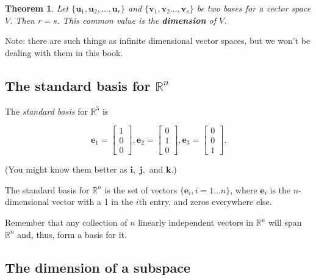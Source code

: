 \documentclass[
]{book}
\newtheorem{theorem}{Theorem}[chapter]
\theoremstyle{definition}
\theoremstyle{definition}
\theoremstyle{definition}
\theoremstyle{definition}
\theoremstyle{remark}
\begin{document}
\begin{theorembox}

\begin{theorem}
Let \(\{\mathbf{u}_1,\mathbf{u}_2,\dots,\mathbf{u}_r\}\) and \(\{\mathbf{v}_1,\mathbf{v}_2\dots,\mathbf{v}_s\}\) be two bases for a vector space \(V\). Then \(r=s\). This common value is the \textbf{dimension} of \(V\).
\end{theorem}

\end{theorembox}

Note: there are such things as infinite dimensional vector spaces, but we won't be dealing with them in this book.

\subsection*{\texorpdfstring{The standard basis for \(\mathbb{R}^n\)}{The standard basis for \textbackslash mathbb\{R\}\^{}n}}\label{the-standard-basis-for-mathbbrn}

The \emph{standard basis} for \(\mathbb{R}^3\) is

\[\mathbf{e}_1=\begin{bmatrix} 1\\0\\0\end{bmatrix},\mathbf{e}_2=\begin{bmatrix}0\\1\\0\end{bmatrix},\mathbf{e}_3=\begin{bmatrix}0\\0\\1\end{bmatrix}.\]

(You might know them better as \(\mathbf{i},\) \(\mathbf{j},\) and \(\mathbf{k}.\))

The standard basis for \(\mathbb{R}^n\) is the set of vectors \(\{\mathbf{e}_i,i=1\dots n\}\), where \(\mathbf{e}_i\) is the \(n\)-dimensional vector with a 1 in the \(i\)th entry, and zeros everywhere else.

Remember that any collection of \(n\) linearly independent vectors in \(\mathbb{R}^n\) will span \(\mathbb{R}^n\) and, thus, form a basis for it.

\subsection*{The dimension of a subspace}\label{the-dimension-of-a-subspace}
\end{document}
